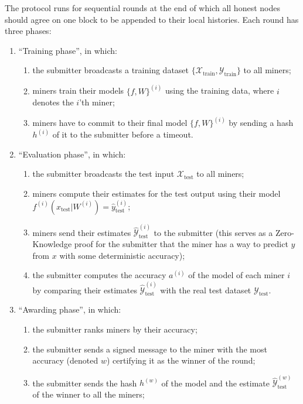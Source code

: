 \documentclass[conference]{IEEEtran}
\begin{document}
The protocol runs for sequential rounds at the end of which all honest nodes should agree on one block to be appended to their local histories. Each round has three phases:
\begin{enumerate}
    \item ``Training phase'', in which:
    \begin{enumerate}
        \item the submitter broadcasts a training dataset $\{\mathcal X_\text{train},\mathcal Y_\text{train}\}$ to all miners;
        \item miners train their models $\{f,W\}^{(i)}$ using the training data, where $i$ denotes the $i$'th miner;
        \item miners have to commit to their final model $\{f,W\}^{(i)}$ by sending a hash $h^{(i)}$ of it to the submitter before a timeout.
    \end{enumerate}
    \item ``Evaluation phase'', in which:
    \begin{enumerate}
        \item the submitter broadcasts the test input $\mathcal X_\text{test}$ to all miners;
        \item miners compute their estimates for the test output using their model $f^{(i)}(x_{\text{test}}|W^{(i)})=\hat y_{\text{test}}^{(i)}$;
        \item miners send their estimates $\hat{\mathcal Y}_{\text{test}}^{(i)}$ to the submitter (this serves as a Zero-Knowledge proof for the submitter that the miner has a way to predict $y$ from $x$ with some deterministic accuracy);
        \item the submitter computes the accuracy $a^{(i)}$ of the model of each miner $i$ by comparing their estimates $\hat{\mathcal Y}_{\text{test}}^{(i)}$ with the real test dataset $\mathcal Y_{\text{test}}$.
    \end{enumerate}
    \item ``Awarding phase'', in which:
    \begin{enumerate}
        \item the submitter ranks miners by their accuracy;
        \item the submitter sends a signed message to the miner with the most accuracy (denoted $w$) certifying it as the winner of the round;
        \item the submitter sends the hash $h^{(w)}$ of the model and the estimate $\hat{\mathcal Y}_{\text{test}}^{(w)}$ of the winner to all the miners;

\end{enumerate}
\end{enumerate}
\end{document}
